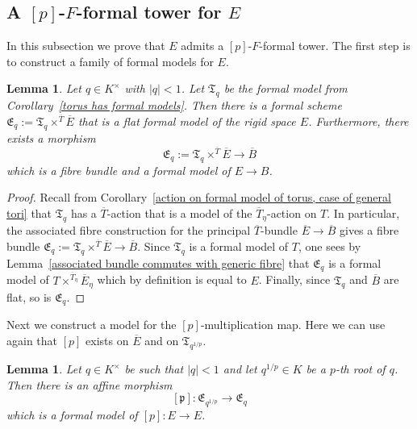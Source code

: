 \documentclass[10pt,oneside]{amsart}
\newtheorem{lemma}[theorem]{Lemma}
\theoremstyle{definition}
\begin{document}
 
	\subsection{A $[p]$-$F$-formal tower for $E$}
	In this subsection we prove that $E$ admits a $[p]$-$F$-formal tower. The first step is to construct a family of formal models for $E$. %
	\begin{lemma}
	Let $q\in K^\times$ with $|q|<1$. Let $\mathfrak T_q$ be the formal model from Corollary~\ref{torus has formal models}. Then there is a formal scheme $\mathfrak E_q :=\mathfrak T_q \times^{\overline{T}}\overline{E}$ that is a flat formal model of the rigid space $E$. Furthermore, there exists a morphism
	\[\mathfrak E_q :=\mathfrak T_q \times^{\overline{T}} \overline{E} \rightarrow \overline{B} \]
	which is a fibre bundle and a formal model of $E\rightarrow B$.
	\end{lemma}
	\begin{proof}
		Recall from Corollary~\ref{action on formal model of torus, case of general tori} that $\mathfrak T_q$ has a $\overline{T}$-action that is a model of the $\overline{T}_\eta$-action on $T$. In particular, the associated fibre construction for the principal $\overline{T}$-bundle $\overline{E}\rightarrow \overline{B}$ gives a fibre bundle $\mathfrak E_q :=\mathfrak T_q \times^{\overline{T}} \overline{E} \rightarrow \overline{B}$. Since $\mathfrak T_q$ is a formal model of $T$, one sees by Lemma~\ref{associated bundle commutes with generic fibre} that $\mathfrak E_q$ is a formal model of $T\times^{\overline{T}_\eta}\overline{E}_\eta$ which by definition is equal to $E$. Finally, since $\mathfrak T_q$ and $\overline{B}$ are flat, so is $\mathfrak E_q$.
	\end{proof}
	
	Next we construct a model for the $[p]$-multiplication map. Here we can use again that $[p]$ exists on $\overline{E}$ and on $\mathfrak T_{q^{1/p}}$.
	\begin{lemma}\label{formal model of p-multiplication on E}
		Let $q\in K^\times$ be such that $|q|<1$ and let $q^{1/p}\in K$ be a $p$-th root of $q$. Then there is an affine morphism
		\[[\mathfrak p]:\mathfrak E_{q^{1/p}} \rightarrow  \mathfrak E_{q}\]
		which is a formal model of $[p]:E\rightarrow E$.
	\end{lemma}
		
\end{document}
